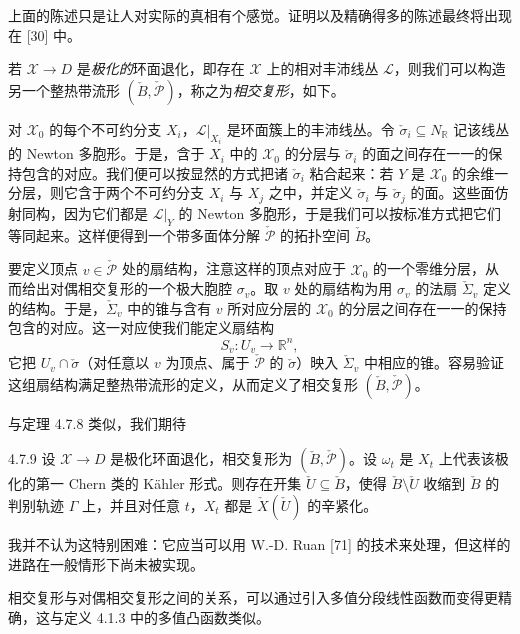 上面的陈述只是让人对实际的真相有个感觉。证明以及精确得多的陈述最终将出现在 [30] 中。

若 $\mathcal{X}\to D$ 是\emph{极化的}环面退化，即存在 $\mathcal{X}$ 上的相对丰沛线丛 $\mathcal{L}$，则我们可以构造另一个整热带流形 $(\check B,\check{\mathcal{P}})$，称之为\emph{相交复形}，如下。

对 $\mathcal{X}_0$ 的每个不可约分支 $X_i$，$\mathcal{L}|_{X_i}$ 是环面簇上的丰沛线丛。令 $\check\sigma_i\subseteq N_{\mathbb{R}}$ 记该线丛的 Newton 多胞形。于是，含于 $X_i$ 中的 $\mathcal{X}_0$ 的分层与 $\check\sigma_i$ 的面之间存在一一的保持包含的对应。我们便可以按显然的方式把诸 $\check\sigma_i$ 粘合起来：若 $Y$ 是 $\mathcal{X}_0$ 的余维一分层，则它含于两个不可约分支 $X_i$ 与 $X_j$ 之中，并定义 $\check\sigma_i$ 与 $\check\sigma_j$ 的面。这些面仿射同构，因为它们都是 $\mathcal{L}|_Y$ 的 Newton 多胞形，于是我们可以按标准方式把它们等同起来。这样便得到一个带多面体分解 $\check{\mathcal{P}}$ 的拓扑空间 $\check B$。

要定义顶点 $v\in\check{\mathcal{P}}$ 处的扇结构，注意这样的顶点对应于 $\mathcal{X}_0$ 的一个零维分层，从而给出对偶相交复形的一个极大胞腔 $\sigma_v$。取 $v$ 处的扇结构为用 $\sigma_v$ 的法扇 $\check\Sigma_v$ 定义的结构。于是，$\check\Sigma_v$ 中的锥与含有 $v$ 所对应分层的 $\mathcal{X}_0$ 的分层之间存在一一的保持包含的对应。这一对应使我们能定义扇结构
\[
S_v:U_v\to\mathbb{R}^n,
\]
它把 $U_v\cap\check\sigma$（对任意以 $v$ 为顶点、属于 $\check{\mathcal{P}}$ 的 $\check\sigma$）映入 $\check\Sigma_v$ 中相应的锥。容易验证这组扇结构满足整热带流形的定义，从而定义了相交复形 $(\check B,\check{\mathcal{P}})$。

与定理 4.7.8 类似，我们期待

\begin{conjecture}{4.7.9}
设 $\mathcal{X}\to D$ 是极化环面退化，相交复形为 $(\check B,\check{\mathcal{P}})$。设 $\omega_t$ 是 $X_t$ 上代表该极化的第一 Chern 类的 Kähler 形式。则存在开集 $\check U\subseteq\check B$，使得 $\check B\setminus\check U$ 收缩到 $\check B$ 的判别轨迹 $\Gamma$ 上，并且对任意 $t$，$X_t$ 都是 $\check X(\check U)$ 的辛紧化。
\end{conjecture}

我并不认为这特别困难：它应当可以用 W.-D. Ruan [71] 的技术来处理，但这样的进路在一般情形下尚未被实现。

相交复形与对偶相交复形之间的关系，可以通过引入多值分段线性函数而变得更精确，这与定义 4.1.3 中的多值凸函数类似。

